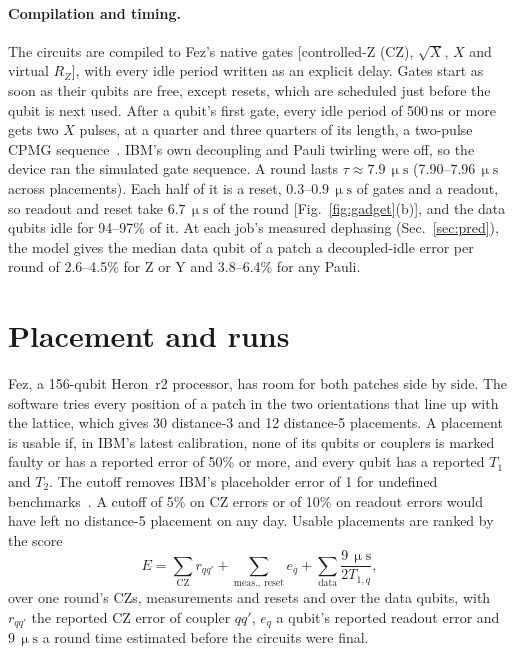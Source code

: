 \documentclass[aps,pra,reprint,nofootinbib,longbibliography,floatfix,showkeys]{revtex4-2}
\newcommand{\us}{\,\upmu\mathrm{s}}
\begin{document}
\paragraph*{Compilation and timing.}
The circuits are compiled to Fez's native gates [controlled-Z (CZ), $\sqrt{X}$, $X$ and virtual $R_Z$], with every idle period written as an explicit delay.
Gates start as soon as their qubits are free, except resets, which are scheduled just before the qubit is next used.
After a qubit's first gate, every idle period of 500\,ns or more gets two $X$ pulses, at a quarter and three quarters of its length, a two-pulse CPMG sequence~\cite{viola1999dynamical,ezzell2023dynamical}.
IBM's own decoupling and Pauli twirling were off, so the device ran the simulated gate sequence.
A round lasts $\tau\approx7.9\us$ (7.90--$7.96\us$ across placements).
Each half of it is a reset, 0.3--$0.9\us$ of gates and a readout, so readout and reset take $6.7\us$ of the round [Fig.~\ref{fig:gadget}(b)], and the data qubits idle for 94--97\% of it.
At each job's measured dephasing (Sec.~\ref{sec:pred}), the model gives the median data qubit of a patch a decoupled-idle error per round of 2.6--4.5\% for Z or Y and 3.8--6.4\% for any Pauli.

\section{Placement and runs}
\label{sec:design}

Fez, a 156-qubit Heron~r2 processor, has room for both patches side by side.
The software tries every position of a patch in the two orientations that line up with the lattice, which gives 30 distance-3 and 12 distance-5 placements.
A placement is usable if, in IBM's latest calibration, none of its qubits or couplers is marked faulty or has a reported error of 50\% or more, and every qubit has a reported $T_1$ and $T_2$.
The cutoff removes IBM's placeholder error of 1 for undefined benchmarks~\cite{ibmdocs}.
A cutoff of 5\% on CZ errors or of 10\% on readout errors would have left no distance-5 placement on any day.
Usable placements are ranked by the score
\begin{equation}
  E = \sum_{\mathrm{CZ}} r_{qq'} + \sum_{\mathrm{meas.,\,reset}} e_q + \sum_{\mathrm{data}} \frac{9\us}{2T_{1,q}} ,
  \label{eq:score}
\end{equation}
over one round's CZs, measurements and resets and over the data qubits, with $r_{qq'}$ the reported CZ error of coupler $qq'$, $e_q$ a qubit's reported readout error and $9\us$ a round time estimated before the circuits were final.
\end{document}
